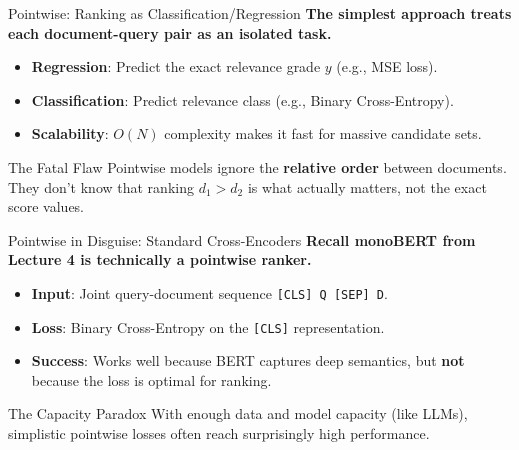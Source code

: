 \documentclass[aspectratio=169]{beamer}
\newif\ifanimated
\newcommand{\cpause}{\ifanimated\pause\fi}
\begin{document}
\begin{frame}[plain]
\sectionpage
\end{frame}



\begin{frame}{Pointwise: Ranking as Classification/Regression}
\textbf{The simplest approach treats each document-query pair as an isolated task.}

\vspace{0.8em}
\begin{itemize}
    \item \textbf{Regression}: Predict the exact relevance grade $y$ (e.g., MSE loss).
    \item \textbf{Classification}: Predict relevance class (e.g., Binary Cross-Entropy).
    \item \textbf{Scalability}: $O(N)$ complexity makes it fast for massive candidate sets.
\end{itemize}\cpause

\vspace{1em}
\cpause
\begin{alertblock}{The Fatal Flaw}
Pointwise models ignore the \textbf{relative order} between documents. They don't know that ranking $d_1 > d_2$ is what actually matters, not the exact score values.
\end{alertblock}
\end{frame}

\begin{frame}{Pointwise in Disguise: Standard Cross-Encoders}
\textbf{Recall monoBERT from Lecture 4 is technically a pointwise ranker.}

\vspace{0.8em}
\begin{itemize}
    \item \textbf{Input}: Joint query-document sequence \texttt{[CLS] Q [SEP] D}.
    \item \textbf{Loss}: Binary Cross-Entropy on the \texttt{[CLS]} representation.
    \item \textbf{Success}: Works well because BERT captures deep semantics, but \textbf{not} because the loss is optimal for ranking.
\end{itemize}\cpause

\vspace{1em}
\cpause
\begin{exampleblock}{The Capacity Paradox}
With enough data and model capacity (like LLMs), simplistic pointwise losses often reach surprisingly high performance.
\end{exampleblock}
\end{frame}
\end{document}
